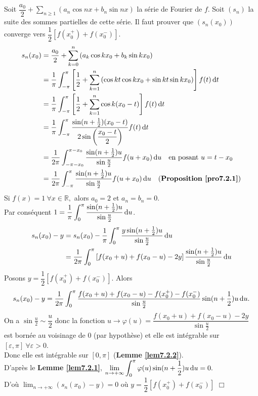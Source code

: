 \documentclass[11pt, a4paper]{book}
\newenvironment{pr}{\noindent {\bf Preuve} \noindent} {\hfill $\Box$\vskip 5mm}
\begin{document}
\begin{pr}\quad
Soit ${\displaystyle \dfrac{a_0}{2}+\sum_{n\geq1}\left(a_n\cos nx+b_n\sin nx\right)}$ la s\'erie de Fourier de $f$. Soit $(s_n)$ la suite des sommes partielles de cette s\'erie. Il faut prouver que $(s_n(x_0))$ converge vers $\dfrac{1}{2}\left[f(x_0^+)+f(x_0^-)\right]$.
\begin{align*}
s_n(x_0)&=\dfrac{a_0}{2}+\sum_{k=0}^n\left(a_k\cos kx_0+b_k\sin kx_0\right)\\
&=\dfrac{1}{\pi}\int_{-\pi}^{\pi}\left[\dfrac{1}{2}+\sum_{k=1}^n\left(\cos kt\cos kx_0+\sin kt\sin kx_0\right)\right]f(t)\,\mathrm{d} t\\
&=\dfrac{1}{\pi}\int_{-\pi}^\pi \left[\dfrac{1}{2}+\sum_{k=1}^n\cos k(x_0-t)\right]f(t)\,\mathrm{d} t\\
&=\dfrac{1}{\pi}\int_{-\pi}^\pi \dfrac{\sin (n+\frac{1}{2})(x_0-t)}{2\sin\left(\dfrac{x_0-t}{2}\right)}f(t)\,\mathrm{d} t\\
&=\dfrac{1}{2\pi} \int_{-\pi-x_0}^{\pi-x_0}\dfrac{\sin(n+\frac{1}{2})u}{\sin\frac{u}{2}}f(u+x_0)\,\mathrm{d} u \quad \text{en posant $u=t-x_0$}\\
&=\dfrac{1}{2\pi}\int_{-\pi}^{\pi}\dfrac{\sin (n+\frac{1}{2})u}{\sin \frac{u}{2}}f(u+x_0)\,\mathrm{d} u \quad (\text{\textbf{Proposition \ref{pro7.2.1}}})
\end{align*}
Si $f(x)=1~\forall x\in \mathbb{R},$ alors $a_0=2$ et $a_n=b_n=0.$ \\
Par cons\'equent ${\displaystyle 1=\dfrac{1}{\pi}\int_0^\pi\dfrac{\sin(n+\frac{1}{2})u}{\sin \frac{u}{2}}\,\mathrm{d} u}$.
\begin{align*}
s_n(x_0)-y&=s_n(x_0)-\dfrac{1}{\pi}\int_0^\pi \dfrac{y\sin(n+\frac{1}{2})u}{\sin \frac{u}{2}}\,\mathrm{d} u\\
&=\dfrac{1}{2\pi}\int_0^\pi\left[f(x_0+u)+f(x_0-u)-2y\right]\dfrac{\sin(n+\frac{1}{2})u}{\sin\frac{u}{2}}\,\mathrm{d} u
\end{align*}
Posons $y=\dfrac{1}{2}[f(x_0^+)+f(x_0^-)].$ Alors $$s_n(x_0)-y=\dfrac{1}{2\pi}\int_0^\pi \dfrac{f(x_0+u)+f(x_0-u)-f(x_0^+)-f(x_0^-)}{\sin \frac{u}{2}}\sin(n+ \frac{1}{2})u\,\mathrm{d} u.$$ On a $\sin \frac{u}{2}\sim\dfrac{u}{2}$ donc la fonction $u\to \varphi(u)=\dfrac{f(x_0+u)+f(x_0-u)-2y}{\sin\frac{u}{2}}$ est born\'ee au voisinage de $0$ (par hypoth\`ese) et elle est int\'egrable sur $[\varepsilon,\pi]~\forall\varepsilon>0.$\\
Donc elle est int\'egrable sur $[0,\pi]$ (\textbf{Lemme \ref{lem7.2.2}}).\\
D'apr\`es le \textbf{Lemme \ref{lem7.2.1}}, ${\displaystyle \lim_{n\to+\infty}\int_0^\pi \varphi(u)\sin(n+\frac{1}{2})u\,\mathrm{d} u=0}.$\\
D'o\`u ${\displaystyle \lim_{n\to+\infty}(s_n(x_0)-y)=0}$ o\`u $y=\dfrac{1}{2}\left[f(x_0^+)+f(x_0^-)\right]$ 
\end{pr}
\end{document}
